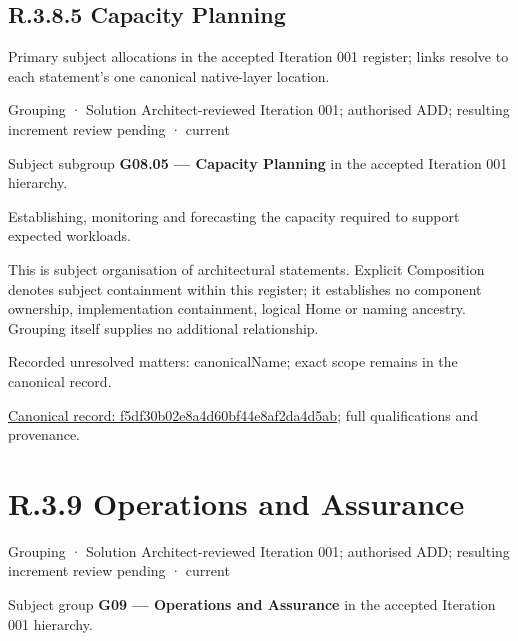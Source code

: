 \subsection*{R.3.8.5 Capacity Planning}
\label{navigation:R.3.8.5}

Primary subject allocations in the accepted Iteration 001 register; links resolve to each statement’s one canonical native-layer location.\par
\label{element:f5df30b02e8a4d60bf44e8af2da4d5ab}
{\small Grouping · Solution Architect-reviewed Iteration 001; authorised ADD; resulting increment review pending · current}\par

Subject subgroup \textbf{G08.05 — Capacity Planning} in the accepted Iteration 001 hierarchy.



Establishing, monitoring and forecasting the capacity required to support expected workloads.



This is subject organisation of architectural statements. Explicit Composition denotes subject containment within this register; it establishes no component ownership, implementation containment, logical Home or naming ancestry. Grouping itself supplies no additional relationship.


{\small Recorded unresolved matters: canonicalName; exact scope remains in the canonical record.}\par
{\footnotesize \href{../../../../continuum/grouping/f5df30b02e8a4d60bf44e8af2da4d5ab.md}{Canonical record: f5df30b02e8a4d60bf44e8af2da4d5ab}; full qualifications and provenance.}\par
\section*{R.3.9 Operations and Assurance}
\label{navigation:R.3.9}

\label{element:16ebd2840f2246a4a9ec9991947f5db2}
{\small Grouping · Solution Architect-reviewed Iteration 001; authorised ADD; resulting increment review pending · current}\par

Subject group \textbf{G09 — Operations and Assurance} in the accepted Iteration 001 hierarchy.



